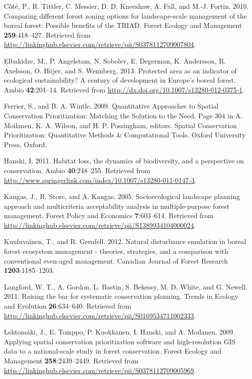 \documentclass[]{article}
\begin{document}
Côté, P., R. Tittler, C. Messier, D. D. Kneeshaw, A. Fall, and M.-J.
Fortin. 2010. Comparing different forest zoning options for
landscape-scale management of the boreal forest: Possible benefits of
the TRIAD. Forest Ecology and Management \textbf{259}:418--427.
Retrieved from
\url{http://linkinghub.elsevier.com/retrieve/pii/S0378112709007804}.

Elbakidze, M., P. Angelstam, N. Sobolev, E. Degerman, K. Andersson, R.
Axelsson, O. Höjer, and S. Wennberg. 2013. Protected area as an
indicator of ecological sustainability? A century of development in
Europe's boreal forest. Ambio \textbf{42}:201--14. Retrieved from
\url{http://dx.doi.org/10.1007/s13280-012-0375-1}.

Ferrier, S., and B. A. Wintle. 2009. Quantitative Approaches to Spatial
Conservation Prioritization: Matching the Solution to the Need. Page 304
in A. Moilanen, K. A. Wilson, and H. P. Possingham, editors. Spatial
Conservation Prioritization: Quantitative Methods \& Computational
Tools. Oxford University Press, Oxford.

Hanski, I. 2011. Habitat loss, the dynamics of biodiversity, and a
perspective on conservation. Ambio \textbf{40}:248--255. Retrieved from
\url{http://www.springerlink.com/index/10.1007/s13280-011-0147-3}.

Kangas, J., R. Store, and A. Kangas. 2005. Socioecological landscape
planning approach and multicriteria acceptability analysis in
multiple-purpose forest management. Forest Policy and Economics
\textbf{7}:603--614. Retrieved from
\url{http://linkinghub.elsevier.com/retrieve/pii/S1389934104000024}.

Kuuluvainen, T., and R. Grenfell. 2012. Natural disturbance emulation in
boreal forest ecosystem management - theories, strategies, and a
comparison with conventional even-aged management. Canadian Journal of
Forest Research \textbf{1203}:1185--1203.

Langford, W. T., A. Gordon, L. Bastin, S. Bekessy, M. D. White, and G.
Newell. 2011. Raising the bar for systematic conservation planning.
Trends in Ecology and Evolution \textbf{26}:634--640. Retrieved from
\url{http://linkinghub.elsevier.com/retrieve/pii/S0169534711002333}.

Lehtomäki, J., E. Tomppo, P. Kuokkanen, I. Hanski, and A. Moilanen.
2009. Applying spatial conservation prioritization software and
high-resolution GIS data to a national-scale study in forest
conservation. Forest Ecology and Management \textbf{258}:2439--2449.
Retrieved from
\url{http://linkinghub.elsevier.com/retrieve/pii/S0378112709005969}.
\end{document}
